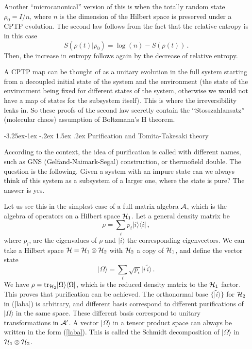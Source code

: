 \documentclass[11pt,a4paper]{article}
\makeatletter
\renewcommand\subsection{\@startsection{subsection}{2}{\z@}%
                                   {-3.25ex\@plus -1ex \@minus -.2ex}%
                                     {1.5ex \@plus .2ex}%
                                     {\normalfont\bfseries}}
\numberwithin{equation}{section}
\newcommand{\be}{\begin{equation}}
\newcommand{\ee}{\end{equation}}
\makeatother
\begin{document}
Another ``microcanonical'' version of this is
when the totally random state $\rho_0=I/n$, where $n$ is the dimension of the
Hilbert space is preserved under a CPTP evolution. 
 The second law follows from the fact that
the relative entropy is in this case
\begin{equation}
S(\rho(t)|\rho_0)=\log(n)-S(\rho(t))\,.
\end{equation}
Then, the increase in entropy follows again by the decrease of relative entropy.

A CPTP map can be thought of as a unitary evolution in the full system starting from a decoupled initial state of the system and the environment (the state of the environment being fixed for different states of the system, otherwise we would not have a map of states for the subsystem itself). This is where the irreversibility leaks in. So these proofs of the second law secretly contain the ``Stosszahlansatz'' (molecular chaos) assumption of Boltzmann's H theorem.     


\subsection{Purification and Tomita-Takesaki theory}
\label{tt}

According to the context, the idea of purification is called with different names, such as GNS (Gelfand-Naimark-Segal) construction, or thermofield double. The question is the following. Given a system with an impure state can we always think of this system as a subsystem of a larger one, where the state is pure? The answer is yes. 

Let us see this in the simplest case of a full matrix algebra ${\cal A}$, which is the algebra of operators on a Hilbert space ${\cal H}_1$. Let a general density matrix be 
\be
\rho=\sum_i p_i |i\rangle \langle i |\,,\label{dm}
\ee
 where $p_i$, are the eigenvalues of $\rho$ and $|i\rangle$ the corresponding eigenvectors. We can take a Hilbert space ${\cal H}={\cal H}_1\otimes {\cal H}_2$ with ${\cal H}_2$ a copy of ${\cal H}_1$, and define the vector state 
\begin{equation}
\vert \Omega \rangle = \sum_i \sqrt{p_i}  \vert i \,\tilde{i}\rangle\,.\label{laba}
\end{equation}
We have $\rho=\textrm{tr}_{{\cal H}_2}\vert \Omega\rangle \langle \Omega \vert$, which is the reduced density matrix to the ${\cal H}_1$ factor. This proves that purification can be achieved. 
The orthonormal base $\{\vert\tilde{i}\rangle\}$ for ${\cal H}_2$ in (\ref{laba}) is arbitrary, and different basis correspond to different purifications of $\vert \Omega \rangle$ in the same space. These different basis correspond to unitary transformations in ${\cal A}'$. A vector $\vert \Omega\rangle$ in a tensor product space can always be written in the form (\ref{laba}). This is called the Schmidt decomposition of $\vert \Omega \rangle$ in ${\cal H}_1\otimes {\cal H}_2$.
\end{document}
